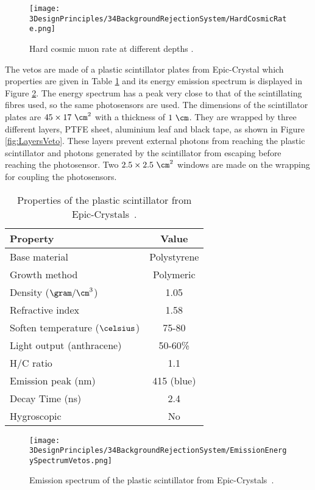 \begin{figure}[h]
\centering
\texttt{[image: 3DesignPrinciples/34BackgroundRejectionSystem/HardCosmicRate.png]}
\caption{Hard cosmic muon rate at different depths \cite{HardCosmicMuonRatePlot}.\label{fig:HardCoscmicRate}}
\end{figure}

The vetos are made of a plastic scintillator plates from Epic-Crystal \cite{ScintillatorVeto} which properties are given in Table \ref{tab:ParametersScintillatorVeto} and its energy emission spectrum is displayed in Figure \ref{fig:EmissionEnergySpectrumVeto}. The energy spectrum has a peak very close to that of the scintillating fibres used, so the same photosensors are used. The dimensions of the scintillator plates are $45 \times 17~\cm^2$ with a thickness of $1~\cm$. They are wrapped by three different layers, PTFE sheet, aluminium leaf and black tape, as shown in Figure \ref{fig:LayersVeto}. These layers prevent external photons from reaching the plastic scintillator and photons generated by the scintillator from escaping before reaching the photosensor. Two $2.5\times 2.5 ~\cm^2$ windows are made on the wrapping for coupling the photosensors.


\begin{table}[htbp]
\centering{}%
\begin{tabular}{lc}
\toprule 
Property & Value \tabularnewline
\midrule
\midrule 
Base material & Polystyrene \tabularnewline
Growth method & Polymeric \tabularnewline
Density ($\gram/\cm^3$)& 1.05 \tabularnewline
Refractive index & 1.58 \tabularnewline
Soften temperature ($\celsius$) & 75-80 \tabularnewline
Light output (anthracene) & 50-60\% \tabularnewline
H/C ratio & 1.1 \tabularnewline
Emission peak (nm) & 415 (blue) \tabularnewline
Decay Time (ns) & 2.4 \tabularnewline
Hygroscopic & No \tabularnewline
\bottomrule
\end{tabular}
\caption{Properties of the plastic scintillator from Epic-Crystals~\cite{ScintillatorVeto}.}
\label{tab:ParametersScintillatorVeto}
\end{table}

\begin{figure}[]
\centering
\texttt{[image: 3DesignPrinciples/34BackgroundRejectionSystem/EmissionEnergySpectrumVetos.png]}
\caption{Emission spectrum of the plastic scintillator from Epic-Crystals\label{fig:EmissionEnergySpectrumVeto}~\cite{ScintillatorVeto}.}
\end{figure}

